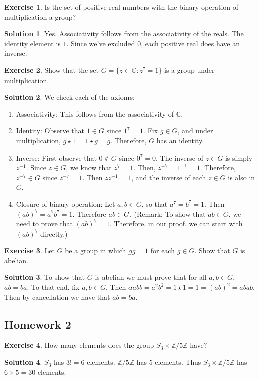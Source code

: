 \documentclass[12pt]{article}
\theoremstyle{definition}
\newtheorem{exercise}{Exercise}
\theoremstyle{definition}
\newtheorem{solution}{Solution}
\newcommand{\Z}{\mathbb{Z}}
\begin{document}
\begin{exercise}
Is the set of positive real numbers with the binary operation of multiplication a group?
\end{exercise}
\begin{solution}
Yes. Associativity follows from the associativity of the reals. The identity element is $1$. Since we've excluded $0$, each positive real does have an inverse.
\end{solution}

\begin{exercise}
Show that the set $G = \{z \in \mathbb{C}: z^7 = 1\}$ is a group under multiplication.
\end{exercise}
\begin{solution}
We check each of the axioms:
\begin{enumerate}
\item Associativity: This follows from the associativity of $\mathbb{C}$.
\item Identity: Observe that $1 \in G$ since $1^7 = 1$. Fix $g \in G$, and under multiplication, $g \star 1 = 1 \star g = g$. Therefore, $G$ has an identity.
\item Inverse: First observe that $0 \not\in G$ since $0^7 = 0$. The inverse of $z \in G$ is simply $z^{-1}$. Since $z \in G$, we know that $z^7 = 1$. Then, $z^{-7} = 1^{-1} = 1$. Therefore, $z^{-7} \in G$ since $z^{-7} = 1$. Then $z z^{-1} = 1$, and the inverse of each $z \in G$ is also in $G$.
\item Closure of binary operation: Let $a,b \in G$, so that $a^7 = b^7 = 1$. Then $(ab)^7 = a^7 b^7 = 1$. Therefore $ab \in G$. (Remark: To show that $ab \in G$, we need to prove that $(ab)^7 = 1$. Therefore, in our proof, we can start with $(ab)^7$ directly.)
\end{enumerate}
\end{solution}

\begin{exercise}
Let $G$ be a group in which $gg = 1$ for each $g \in G$. Show that $G$ is abelian.
\end{exercise}
\begin{solution}
To show that $G$ is abelian we must prove that for all $a,b \in G$, $ab = ba$. To that end, fix $a,b \in G$. Then $aabb = a^2 b^2 = 1 \star 1 = 1 = (ab)^2 = abab$. Then by cancellation we have that $ab = ba$.
\end{solution}


\subsection{Homework 2}
\begin{exercise}
How many elements does the group $S_3 \times \mathbb{Z}/5\mathbb{Z}$ have?
\end{exercise}
\begin{solution}
$S_3$ has $3! = 6$ elements. $\Z / 5 \Z$ has 5 elements. Thus $S_3 \times \mathbb{Z}/5\mathbb{Z}$ has $ 6 \times 5 = 30$ elements. 
\end{solution}
\end{document}
